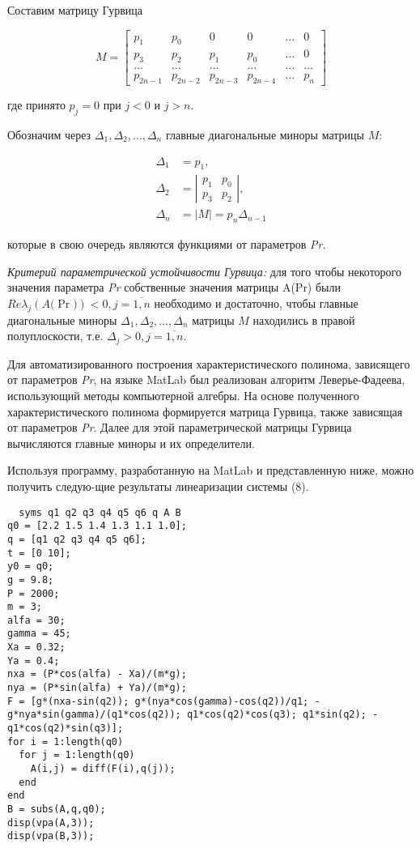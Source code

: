 Составим матрицу Гурвица \begin{center}
  \[
  M = \begin{bmatrix} 
  p_{1} & p_{0} & 0 & 0 & \dots & 0 \\
  p_{3} & p_{2} & p_{1} & p_{0} & \dots & 0 \\
  \dots & \dots & \dots & \dots & \dots & \dots \\
  p_{2n-1} & p_{2n-2} & p_{2n-3} & p_{2n-4} & \dots & p_{n}
  \end{bmatrix}
  \]
  
\end{center}
где принято \({p}_{{j}}{= 0}\) при
\({j < 0}\) и \({j > n}\).

Обозначим через
\(\Delta_{1}, \Delta_{2}, \ldots, \Delta_{n}\)
главные диагональные миноры матрицы \(M\):

\[
\begin{array}{rl}
\Delta_{1} & = p_{1}, \\
\Delta_{2} & = \left| \begin{matrix}
p_{1} & p_{0} \\
p_{3} & p_{2}
\end{matrix} \right|, \\
\Delta_{n} & = \left| M \right| = p_{n} \Delta_{n-1}
\end{array}
\]


которые в свою очередь являются функциями от параметров \emph{Pr}.

\emph{Критерий параметрической устойчивости Гурвица:} для того чтобы
некоторого значения параметра \emph{Pr} собственные значения матрицы
A(Pr) были
\({Re}{\lambda}_{{j}}\left( {A(}{\Pr}{)} \right){< 0,j =}\overline{{1,n}}\)
необходимо и достаточно, чтобы главные диагональные миноры
\({\Delta}_{{1}}{,}{\Delta}_{{2}}{,...,}{\Delta}_{{n}}\)
матрицы \({M}\) находились в правой полуплоскости, т.е.
\({\Delta}_{{j}}{> 0,j =}\overline{{1,n}}\).


Для автоматизированного построения характеристического полинома,
зависящего от параметров \emph{Pr}, на языке MatLab был реализован
алгоритм Леверье-Фадеева, использующий методы компьютерной алгебры. На
основе полученного характеристического полинома формируется матрица
Гурвица, также зависящая от параметров \emph{Pr}. Далее для этой
параметрической матрицы Гурвица вычисляются главные миноры и их
определители.

Используя программу, разработанную на MatLab и представленную ниже,
можно получить следую-щие результаты линеаризации системы (8).
\begin{lstlisting}
  syms q1 q2 q3 q4 q5 q6 q A B
q0 = [2.2 1.5 1.4 1.3 1.1 1.0];
q = [q1 q2 q3 q4 q5 q6];
t = [0 10];   
y0 = q0;
g = 9.8; 
P = 2000; 
m = 3; 
alfa = 30; 
gamma = 45; 
Xa = 0.32; 
Ya = 0.4;
nxa = (P*cos(alfa) - Xa)/(m*g);  
nya = (P*sin(alfa) + Ya)/(m*g);
F = [g*(nxa-sin(q2)); g*(nya*cos(gamma)-cos(q2))/q1; -g*nya*sin(gamma)/(q1*cos(q2)); q1*cos(q2)*cos(q3); q1*sin(q2); -q1*cos(q2)*sin(q3)];
for i = 1:length(q0)
  for j = 1:length(q0)
    A(i,j) = diff(F(i),q(j));
  end
end
B = subs(A,q,q0);
disp(vpa(A,3));
disp(vpa(B,3));

\end{lstlisting}




